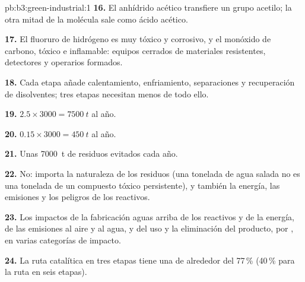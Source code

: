 \begin{solution}{pb:b3:green-industrial:1}
\textbf{16.} El anhídrido acético transfiere un grupo acetilo; la otra mitad de la
molécula sale como ácido acético.

\textbf{17.} El fluoruro de hidrógeno es muy tóxico y corrosivo, y el monóxido de carbono, tóxico e
inflamable: equipos cerrados de materiales resistentes, detectores y operarios
formados.

\textbf{18.} Cada etapa añade calentamiento, enfriamiento, separaciones y recuperación de disolventes; tres
etapas necesitan menos de todo ello.

\textbf{19.} $2.5 \times 3000 = \qty{7500}{t}$ al año.

\textbf{20.} $0.15 \times 3000 = \qty{450}{t}$ al año.

\textbf{21.} Unas \qty{7000}{t} de residuos evitados cada año.

\textbf{22.} No: importa la naturaleza de los residuos (una tonelada de agua salada no es una tonelada de
un compuesto tóxico persistente), y también la energía, las emisiones y los peligros de los
reactivos.

\textbf{23.} Los impactos de la fabricación aguas arriba de los reactivos y de la energía, de las emisiones al
aire y al agua, y del uso y la eliminación del producto, por , en
varias categorías de impacto.

\textbf{24.} La ruta catalítica en tres etapas tiene una  de alrededor del 77\,\% (40\,\% para la
ruta en seis etapas).
\end{solution}
